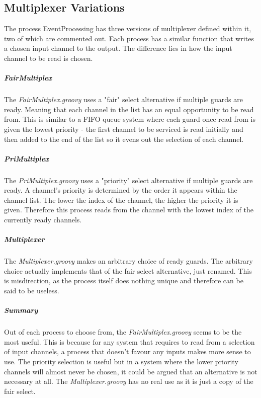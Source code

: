 \documentclass[10pt, a4paper]{article}
\begin{document}
   
   \subsection{Multiplexer Variations}
   
   The process EventProcessing has three versions of multiplexer defined within it, two of which are commented out. Each process has a similar function that writes a chosen input channel to the output. The difference lies in how the input channel to be read is chosen. 
   
   
   \subparagraph{FairMultiplex}
   
   The \textit{FairMultiplex.groovy} uses a "fair" select alternative if multiple guards are ready. Meaning that each channel in the list has an equal opportunity to be read from. This is similar to a FIFO queue system where each guard once read from is given the lowest priority - the first channel to be serviced is read initially and then added to the end of the list so it evens out the selection of each channel.
   
   \subparagraph{PriMultiplex}
   
   The \textit{PriMultiplex.groovy} uses a "priority" select alternative if multiple guards are ready. A channel's priority is determined by the order it appears within the channel list. The lower the index of the channel, the higher the priority it is given. Therefore this process reads from the channel with the lowest index of the currently ready channels.
  
   \subparagraph{Multiplexer}
   
   The \textit{Multiplexer.groovy} makes an arbitrary choice of ready guards. The arbitrary choice actually implements that of the fair select alternative, just renamed. This is misdirection, as the process itself does nothing unique and therefore can be said to be useless.  
   
   \subparagraph{Summary}
   Out of each process to choose from, the \textit{FairMultiplex.groovy} seems to be the most useful. This is because for any system that requires to read from a selection of input channels, a process that doesn't favour any inputs makes more sense to use. The priority selection is useful but in a system where the lower priority channels will almost never be chosen, it could be argued that an alternative is not necessary at all. The \textit{Multiplexer.groovy} has no real use as it is just a copy of the fair select.
   
\end{document}
